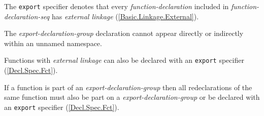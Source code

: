 \p The \texttt{export} specifier denotes that every \textit{function-declaration} included in \textit{function-declaration-seq} has \textit{external linkage} (\ref{Basic.Linkage.External}).

\p The \textit{export-declaration-group} declaration cannot appear directly or indirectly within an unnamed namespace.

\p Functions with \textit{external linkage} can also be declared with an \texttt{export} specifier (\ref{Decl.Spec.Fct}).

\p If a function is part of an \textit{export-declaration-group} then all redeclarations of the same function must also be part on a \textit{export-declaration-group} or be declared with an \texttt{export} specifier (\ref{Decl.Spec.Fct}).
